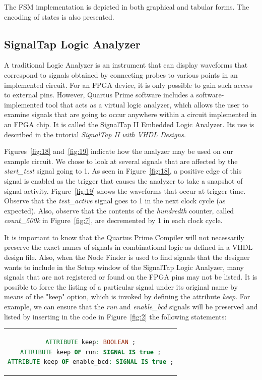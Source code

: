 \documentclass[11pt, twoside, pdftex]{article}
\begin{document}
The FSM implementation is depicted in both graphical and tabular forms.
The encoding of states is also presented. 

\subsection{SignalTap Logic Analyzer}
A traditional Logic Analyzer is an instrument that can display waveforms that
correspond to signals obtained by connecting probes to various points in an
implemented circuit. For an FPGA device, it is only possible to gain such access
to external pins. However, Quartus Prime software includes a software-implemented tool 
that acts as a virtual logic analyzer, which allows the user to examine signals
that are going to occur anywhere within a circuit implemented in an FPGA chip. 
It is called the SignalTap II Embedded Logic Analyzer. Its use is described in the
tutorial {\it SignalTap II with VHDL Designs}.

Figures~\ref{fig:18} and~\ref{fig:19} indicate how the analyzer may be used on our example
circuit. We chose to look at several signals that are affected by the
{\it start\_test} signal going to 1. As seen in Figure~\ref{fig:18}, a positive edge
of this signal is enabled as the trigger that causes the analyzer to take a 
snapshot of signal activity. Figure~\ref{fig:19} shows the waveforms that occur at
trigger time. Observe that the {\it test\_active} signal goes to 1 in the
next clock cycle (as expected). Also, observe that the contents of the
{\it hundredth} counter, called {\it count\_500k} in Figure~\ref{fig:7}, are decremented
by 1 in each clock cycle.

It is important to know that the Quartus Prime Compiler will not necessarily 
preserve the exact names of signals in combinational logic as defined in a VHDL
design file. Also, when the Node Finder is used to find signals that the
designer wants to include in the Setup window of the SignalTap Logic Analyzer,
many signals that are not registered or found on the FPGA pins may not be listed.
It is possible to force the listing of a particular signal under its original name
by means of the "keep" option, which is invoked by defining the attribute {\it keep}. 
For example, we can ensure that the {\it run} and 
{\it enable\_bcd} signals will be preserved and listed by inserting in the code in 
Figure~\ref{fig:2} the following statements:
\begin{center}
\begin{tabular}{c}
\begin{lstlisting}[language=VHDL]
ATTRIBUTE keep: BOOLEAN ;
ATTRIBUTE keep OF run: SIGNAL IS true ;
ATTRIBUTE keep OF enable_bcd: SIGNAL IS true ;
\end{lstlisting}
\end{tabular} 
\end{center}
\end{document}
